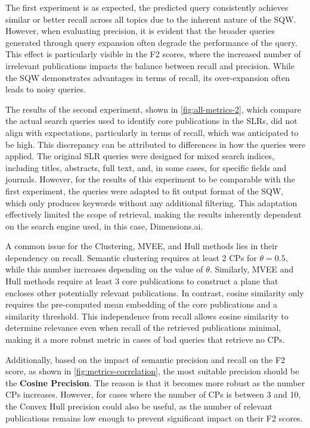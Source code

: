The first experiment is as expected, the predicted query consistently achieves similar or better recall across all topics due to the inherent nature of the SQW. However, when evaluating precision, it is evident that the broader queries generated through query expansion often degrade the performance of the query. This effect is particularly visible in the F2 scores, where the increased number of irrelevant publications impacts the balance between recall and precision. While the SQW demonstrates advantages in terms of recall, its over-expansion often leads to noisy queries.

The results of the second experiment, shown in \autoref{fig:all-metrics-2}, which compare the actual search queries used to identify core publications in the SLRs, did not align with expectations, particularly in terms of recall, which was anticipated to be high. This discrepancy can be attributed to differences in how the queries were applied. The original SLR queries were designed for mixed search indices, including titles, abstracts, full text, and, in some cases, for specific fields and journals. However, for the results of this experiment to be comparable with the first experiment, the queries were adapted to fit output format of the SQW, which only produces keywords without any additional filtering. This adaptation effectively limited the scope of retrieval, making the results inherently dependent on the search engine used, in this case, Dimensions.ai.

A common issue for the Clustering, MVEE, and Hull methods lies in their dependency on recall. Semantic clustering requires at least 2 CPs for $\theta=0.5$, while this number increases depending on the value of $\theta$. Similarly, MVEE and Hull methods require at least 3 core publications to construct a plane that encloses other potentially relevant publications. In contrast, cosine similarity only requires the pre-computed mean embedding of the core publications and a similarity threshold. This independence from recall allows cosine similarity to determine relevance even when recall of the retrieved publications minimal, making it a more robust metric in cases of bad queries that retrieve no CPs.

Additionally, based on the impact of semantic precision and recall on the F2 score, as shown in \autoref{fig:metrics-correlation}, the most suitable precision should be the \textbf{Cosine Precision}. The reason is that it becomes more robust as the number CPs increases. However, for cases where the number of CPs is between 3 and 10, the Convex Hull precision could also be useful, as the number of relevant publications remains low enough to prevent significant impact on their F2 scores.





